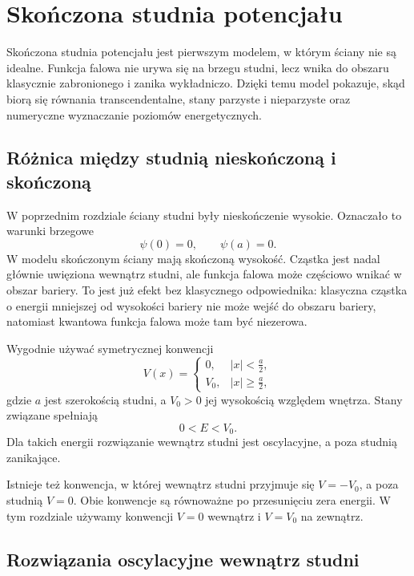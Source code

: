 \chapter{Skończona studnia potencjału}

\begin{summarybox}
Skończona studnia potencjału jest pierwszym modelem, w którym ściany nie są
idealne. Funkcja falowa nie urywa się na brzegu studni, lecz wnika do obszaru
klasycznie zabronionego i zanika wykładniczo. Dzięki temu model pokazuje,
skąd biorą się równania transcendentalne, stany parzyste i nieparzyste oraz
numeryczne wyznaczanie poziomów energetycznych.
\end{summarybox}

\section{Różnica między studnią nieskończoną i skończoną}

W poprzednim rozdziale ściany studni były nieskończenie wysokie. Oznaczało to warunki brzegowe
\[
    \psi(0)=0,\qquad \psi(a)=0.
\]
W modelu skończonym ściany mają skończoną wysokość. Cząstka jest nadal głównie uwięziona wewnątrz studni, ale funkcja falowa może częściowo wnikać w obszar bariery. To jest już efekt bez klasycznego odpowiednika: klasyczna cząstka o energii mniejszej od wysokości bariery nie może wejść do obszaru bariery, natomiast kwantowa funkcja falowa może tam być niezerowa.

Wygodnie używać symetrycznej konwencji
\[
V(x)=
\begin{cases}
0, & |x|<\frac{a}{2},\\
V_0, & |x|\geq \frac{a}{2},
\end{cases}
\]
gdzie \(a\) jest szerokością studni, a \(V_0>0\) jej wysokością względem wnętrza. Stany związane spełniają
\[
0<E<V_0.
\]
Dla takich energii rozwiązanie wewnątrz studni jest oscylacyjne, a poza studnią zanikające.

\begin{remarkbox}
Istnieje też konwencja, w której wewnątrz studni przyjmuje się \(V=-V_0\), a poza studnią \(V=0\). Obie konwencje są równoważne po przesunięciu zera energii. W tym rozdziale używamy konwencji \(V=0\) wewnątrz i \(V=V_0\) na zewnątrz.
\end{remarkbox}

\section{Rozwiązania oscylacyjne wewnątrz studni}

